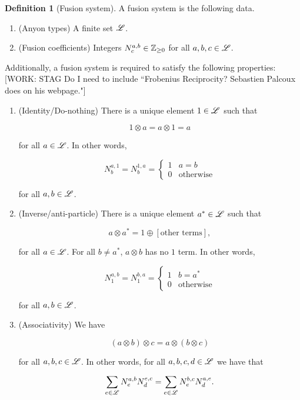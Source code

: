 \documentclass{article}
\theoremstyle{definition}
\newtheorem*{definition}{Definition}
\numberwithin{figure}{section}
\begin{document}
\begin{definition}[Fusion system] A fusion system is the following data.

\begin{enumerate}
\item (Anyon types) A finite set $\mathscr{L}$.
\item (Fusion coefficients) Integers $N_{c}^{a,b}\in \mathbb{Z}_{\geq 0}$ for all $a,b,c\in \mathscr{L}$.
\end{enumerate}

Additionally, a fusion system is required to satisfy the following properties: [WORK: STAG Do I need to include ``Frobenius Reciprocity? Sebastien Palcoux does on his webpage."]

\begin{enumerate}
\item (Identity/Do-nothing) There is a unique element $1\in \mathscr{L}$ such that

$$1\otimes a=a\otimes 1=a$$

for all $a\in \mathscr{L}$. In other words,

$$N^{a,1}_{b}=N^{1,a}_{b}=\begin{cases}1 & a=b \\ 0 & \text{otherwise}\end{cases}$$

for all $a,b\in \mathscr{L}$.

\item (Inverse/anti-particle) There is a unique element $a^*\in \mathscr{L}$ such that

$$a\otimes a^*=1\oplus [\text{other terms}],$$

for all $a\in \mathscr{L}$. For all $b\neq a^*$, $a\otimes b$ has no $1$ term. In other words,

$$N^{a,b}_{1}=N^{b,a}_{1}=\begin{cases} 1 & b=a^* \\ 0 & \text{otherwise}\end{cases}$$

for all $a, b\in \mathscr{L}$.

\item (Associativity) We have

$$(a\otimes b)\otimes c=a\otimes (b\otimes c)$$

for all $a,b,c\in \mathscr{L}$. In other words, for all $a,b,c,d\in \mathscr{L}$ we have that

$$\sum_{e\in \mathscr{L}}N_e^{a,b}N_{d}^{e,c}=\sum_{e\in \mathscr{L}}N_{e}^{b,c}N_d^{a,e}.$$
\end{enumerate}

\raggedleft\qedsymbol{}
\end{definition}
\end{document}
